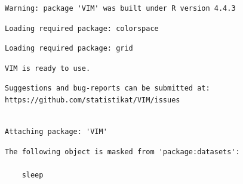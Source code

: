 \documentclass[
  letterpaper,
  DIV=11,
  numbers=noendperiod]{scrartcl}
\newenvironment{Shaded}{\begin{snugshade}}{\end{snugshade}}
\newcommand{\AttributeTok}[1]{\textcolor[rgb]{0.40,0.45,0.13}{#1}}
\newcommand{\CommentTok}[1]{\textcolor[rgb]{0.37,0.37,0.37}{#1}}
\newcommand{\ConstantTok}[1]{\textcolor[rgb]{0.56,0.35,0.01}{#1}}
\newcommand{\DecValTok}[1]{\textcolor[rgb]{0.68,0.00,0.00}{#1}}
\newcommand{\FunctionTok}[1]{\textcolor[rgb]{0.28,0.35,0.67}{#1}}
\newcommand{\NormalTok}[1]{\textcolor[rgb]{0.00,0.23,0.31}{#1}}
\newcommand{\OtherTok}[1]{\textcolor[rgb]{0.00,0.23,0.31}{#1}}
\newcommand{\SpecialCharTok}[1]{\textcolor[rgb]{0.37,0.37,0.37}{#1}}
\newcommand{\StringTok}[1]{\textcolor[rgb]{0.13,0.47,0.30}{#1}}
\begin{document}
\begin{verbatim}
Warning: package 'VIM' was built under R version 4.4.3
\end{verbatim}

\begin{verbatim}
Loading required package: colorspace
\end{verbatim}

\begin{verbatim}
Loading required package: grid
\end{verbatim}

\begin{verbatim}
VIM is ready to use.
\end{verbatim}

\begin{verbatim}
Suggestions and bug-reports can be submitted at: https://github.com/statistikat/VIM/issues
\end{verbatim}

\begin{verbatim}

Attaching package: 'VIM'
\end{verbatim}

\begin{verbatim}
The following object is masked from 'package:datasets':

    sleep
\end{verbatim}

\begin{Shaded}
\end{Shaded}
\end{document}
